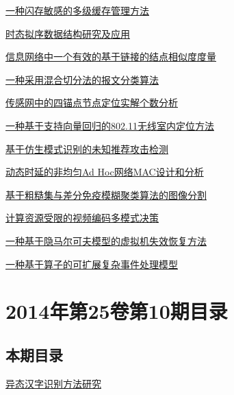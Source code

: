 \documentclass[a4paper]{article}
\begin{document}
\href{http://www.jos.org.cn/ch/reader/download_pdf.aspx?file_no=4573&year_id=2014&quarter_id=11&falg=1}{一种闪存敏感的多级缓存管理方法}

\href{http://www.jos.org.cn/ch/reader/download_pdf.aspx?file_no=4574&year_id=2014&quarter_id=11&falg=1}{时态拟序数据结构研究及应用}

\href{http://www.jos.org.cn/ch/reader/download_pdf.aspx?file_no=4578&year_id=2014&quarter_id=11&falg=1}{信息网络中一个有效的基于链接的结点相似度度量}

\href{http://www.jos.org.cn/ch/reader/download_pdf.aspx?file_no=4512&year_id=2014&quarter_id=11&falg=1}{一种采用混合切分法的报文分类算法}

\href{http://www.jos.org.cn/ch/reader/download_pdf.aspx?file_no=4544&year_id=2014&quarter_id=11&falg=1}{传感网中的四锚点节点定位实解个数分析}

\href{http://www.jos.org.cn/ch/reader/download_pdf.aspx?file_no=4545&year_id=2014&quarter_id=11&falg=1}{一种基于支持向量回归的802.11无线室内定位方法}

\href{http://www.jos.org.cn/ch/reader/download_pdf.aspx?file_no=4550&year_id=2014&quarter_id=11&falg=1}{基于仿生模式识别的未知推荐攻击检测}

\href{http://www.jos.org.cn/ch/reader/download_pdf.aspx?file_no=4552&year_id=2014&quarter_id=11&falg=1}{动态时延的非均匀Ad Hoc网络MAC设计和分析}

\href{http://www.jos.org.cn/ch/reader/download_pdf.aspx?file_no=4519&year_id=2014&quarter_id=11&falg=1}{基于粗糙集与差分免疫模糊聚类算法的图像分割}

\href{http://www.jos.org.cn/ch/reader/download_pdf.aspx?file_no=4695&year_id=2014&quarter_id=11&falg=1}{计算资源受限的视频编码多模式决策}

\href{http://www.jos.org.cn/ch/reader/download_pdf.aspx?file_no=4548&year_id=2014&quarter_id=11&falg=1}{一种基于隐马尔可夫模型的虚拟机失效恢复方法}

\href{http://www.jos.org.cn/ch/reader/download_pdf.aspx?file_no=4549&year_id=2014&quarter_id=11&falg=1}{一种基于算子的可扩展复杂事件处理模型}


\section{\textbf{2014年第25卷第10期目录}}
\subsection{本期目录}
\href{http://www.jos.org.cn/ch/reader/download_pdf.aspx?file_no=4502&year_id=2014&quarter_id=10&falg=1}{异态汉字识别方法研究}
\end{document}

